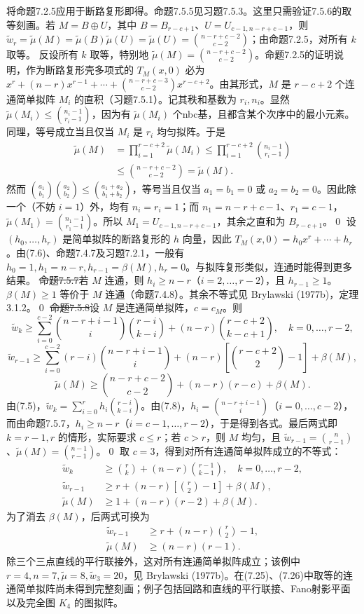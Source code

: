 \pr 将命题7.2.5应用于断路复形即得。命题7.5.5见习题7.5.3。这里只需验证7.5.6的取等刻画。若 $M=B\oplus U$，其中 $B=B_{r-c+1}$、$U=U_{c-1,n-r+c-1}$，则 $\widetilde w_r=\widetilde\mu(M)=\widetilde\mu(B)\widetilde\mu(U)=\widetilde\mu(U)=\binom{n-r+c-2}{c-2}$；由命题7.2.5，对所有 $k$ 取等。
反设所有 $k$ 取等，特别地 $\widetilde\mu(M)=\binom{n-r+c-2}{c-2}$。命题7.2.5的证明说明，作为断路复形壳多项式的 $T_M(x,0)$ 必为 $x^r+(n-r)x^{r-1}+\cdots+\binom{n-r+c-3}{c-2}x^{r-c+2}$。由其形式，$M$ 是 $r-c+2$ 个连通简单拟阵 $M_i$ 的直积（习题7.5.1）。记其秩和基数为 $r_i,n_i$。显然 $\widetilde\mu(M_i)\le\binom{n_i-1}{r_i-1}$，因为有 $\widetilde\mu(M_i)$ 个nbc基，且都含某个次序中的最小元素。同理，等号成立当且仅当 $M_i$ 是 $r_i$ 均匀拟阵。于是
\[\begin{aligned}
\widetilde\mu(M)&=\prod_{i=1}^{r-c+2}\widetilde\mu(M_i)
\le\prod_{i=1}^{r-c+2}\binom{n_i-1}{r_i-1}\\
&\le\binom{n-r+c-2}{c-2}=\widetilde\mu(M).
\end{aligned}\]
然而 $\binom{a_1}{b_1}\binom{a_2}{b_2}\le\binom{a_1+a_2}{b_1+b_2}$，等号当且仅当 $a_1=b_1=0$ 或 $a_2=b_2=0$。因此除一个（不妨 $i=1$）外，均有 $n_i=r_i=1$；而 $n_1=n-r+c-1$、$r_1=c-1$，$\widetilde\mu(M_1)=\binom{n_1-1}{r_1-1}$。所以 $M_1=U_{c-1,n-r+c-1}$，其余之直和为 $B_{r-c+1}$。\qed
{}
设 $(h_0,\ldots,h_r)$ 是简单拟阵的断路复形的 $h$ 向量，因此 $T_M(x,0)=h_0x^r+\cdots+h_r$。由(7.6)、命题7.4.7及习题7.2.1，一般有 $h_0=1,h_1=n-r,h_{r-1}=\beta(M),h_r=0$。与拟阵复形类似，连通时能得到更多结果。
\st{命题7.5.7}若 $M$ 连通，则 $h_i\ge n-r$（$i=2,\ldots,r-2$），且 $h_{r-1}\ge1$。
\pr $\beta(M)\ge1$ 等价于 $M$ 连通（命题7.4.8）。其余不等式见 Brylawski (1977b)，定理3.1.2。\qed
\st{命题7.5.8}设 $M$ 是连通简单拟阵，$c=c_M$。则
\[\widetilde w_k\ge\sum_{i=0}^{c-2}\binom{n-r+i-1}{i}\binom{r-i}{k-i}+(n-r)\binom{r-c+2}{k-c+1},\quad k=0,\ldots,r-2,\]
\[\widetilde w_{r-1}\ge\sum_{i=0}^{c-2}(r-i)\binom{n-r+i-1}{i}+(n-r)\left[\binom{r-c+2}2-1\right]+\beta(M),\]
\[\widetilde\mu(M)\ge\binom{n-r+c-2}{c-2}+(n-r)(r-c)+\beta(M).\]
\pr 由(7.5)，$\widetilde w_k=\sum_{i=0}^rh_i\binom{r-i}{k-i}$。由(7.8)，$h_i=\binom{n-r+i-1}i$（$i=0,\ldots,c-2$），而由命题7.5.7，$h_i\ge n-r$（$i=c-1,\ldots,r-2$），于是得到各式。最后两式即 $k=r-1,r$ 的情形，实际要求 $c\le r$；若 $c>r$，则 $M$ 均匀，且 $\widetilde w_{r-1}=\binom n{r-1}$、$\widetilde\mu(M)=\binom{n-1}{r-1}$。\qed
取 $c=3$，得到对所有连通简单拟阵成立的不等式：
\[\begin{aligned}
\widetilde w_k&\ge\binom rk+(n-r)\binom{r-1}{k-1},\quad k=0,\ldots,r-2,\\
\widetilde w_{r-1}&\ge r+(n-r)\left[\binom r2-1\right]+\beta(M),\\
\widetilde\mu(M)&\ge1+(n-r)(r-2)+\beta(M).
\end{aligned}\tag{7.25}\]
为了消去 $\beta(M)$，后两式可换为
\[\begin{aligned}
\widetilde w_{r-1}&\ge r+(n-r)\binom r2-1,\\
\widetilde\mu(M)&\ge(n-r)(r-1).
\end{aligned}\tag{7.26}\]
除三个三点直线的平行联接外，这对所有连通简单拟阵成立；该例中 $r=4,n=7,\widetilde\mu=8,\widetilde w_3=20$，见 Brylawski (1977b)。在(7.25)、(7.26)中取等的连通简单拟阵尚未得到完整刻画；例子包括回路和直线的平行联接、Fano射影平面以及完全图 $K_4$ 的图拟阵。
